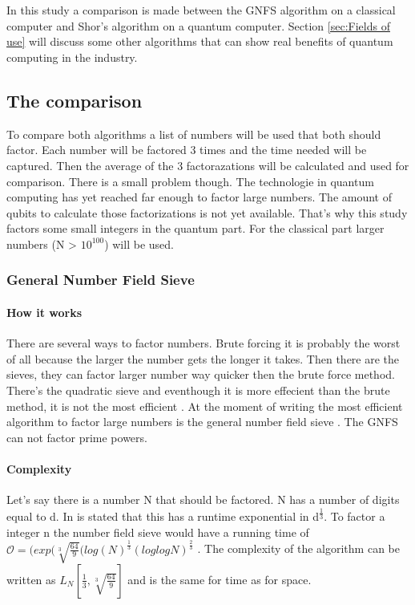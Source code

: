 
\chapter{}
\label{ch:onderzoek}



In this study a comparison is made between the GNFS algorithm on a classical computer and Shor's algorithm on a quantum computer.
Section \ref{sec:Fields of use} will discuss some other algorithms that can show real benefits of quantum computing in the industry.
\section{The comparison}

To compare both algorithms a list of numbers will be used that both should factor. Each number will be factored 3 times and the time needed will be captured. Then the average of the 3 factorazations will be calculated and used for comparison.
There is a small problem though. The technologie in quantum computing has yet reached far enough to factor large numbers. The amount of qubits to calculate those factorizations is not yet available. 
That's why this study factors some small integers in the quantum part. For the classical part larger numbers (N > $10^100$) will be used.
\subsection{General Number Field Sieve}
\subsubsection{How it works}
There are several ways to factor numbers. Brute forcing it is probably the worst of all because the larger the number gets the longer it takes. Then there are the sieves, they can factor larger number way quicker then the brute force method.
There's the quadratic sieve and eventhough it is more effecient than the brute method, it is not the most efficient \autocite{Quadratic_sieve}. At the moment of writing the most efficient algorithm to factor large numbers is the general number field sieve \autocite{shor_algo}.
The GNFS can not factor prime powers.

\subsubsection{Complexity}
Let's say there is a number N that should be factored. N has a number of digits equal to d. In \textcite{shor_algo} is stated that this has a runtime exponential in d\textsuperscript{$\frac{1}{3}$}.
To factor a integer n the number field sieve would have a running time of $\mathcal{O} = (exp(\sqrt[3]{\frac{64}{9}}(log(N)^\frac{1}{3}(log log N)^\frac{2}{3}$ \autocite{nfscomp}.
The complexity of the algorithm can be written as $L_N[\frac{1}{3},\sqrt[3]{\frac{64}{9}}]$ and is the same for time as for space.
